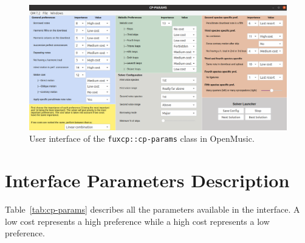 \begin{figure}[h!]
    \includegraphics[width=1.4\textwidth, center]{Images/om_int_interface.png}
    \caption{User interface of the \texttt{fuxcp::cp-params} class in OpenMusic.}
    \label{fig:om_int_interface}
\end{figure}

\section{Interface Parameters Description} \label{appendix:interface-parameters-description}
Table~\ref{tab:cp-params} describes all the parameters available in the interface. A low cost represents a high preference while a high cost represents a low preference.

